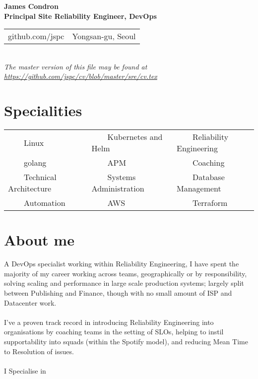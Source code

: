\documentclass[11pt,a4paper,sans]{article}
\newcommand{\tabitem}{~~\llap{\textbullet}~~}
\begin{document}
\begin{center}
  {\huge\textbf{James Condron}}\\
  \textbf{Principal Site Reliability Engineer, DevOps} \\

  \begin{tabular}{rl}
    github.com/jspc & Yongsan-gu, Seoul
  \end{tabular} \\

  {\footnotesize\textit{The master version of this file may be found at \url{https://github.com/jspc/cv/blob/master/sre/cv.tex}}}
\end{center}

\section{Specialities}
\begin{tabular}{lll}
  \tabitem Linux & \tabitem Kubernetes and Helm & \tabitem Reliability Engineering \\
  \tabitem golang & \tabitem APM & \tabitem Coaching \\
  \tabitem Technical Architecture & \tabitem Systems Administration & \tabitem Database Management \\
  \tabitem Automation & \tabitem AWS & \tabitem Terraform  \\
\end{tabular}

\section{About me}
A DevOps specialist working within Reliability Engineering, I have spent the majority of my career working across teams, geographically or by responsibility, solving scaling and performance in large scale production systems; largely split between Publishing and Finance, though with no small amount of ISP and Datacenter work. \\
\\
I've a proven track record in introducing Reliability Engineering into organisations by coaching teams in the setting of SLOs, helping to instil supportability into squads (within the Spotify model), and reducing Mean Time to Resolution of issues. \\
\\
I Specialise in
\end{document}
